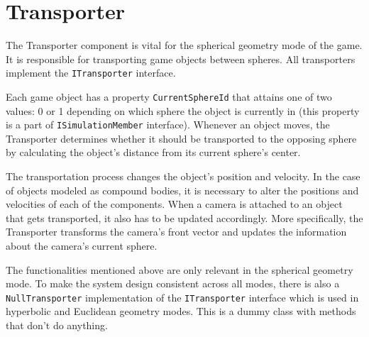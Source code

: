\section{Transporter}
The Transporter component is vital for the spherical geometry mode of the game.
It is responsible for transporting game objects between spheres.
All transporters implement the \texttt{ITransporter} interface.

Each game object has a property \texttt{CurrentSphereId} that attains one of two values: 0 or 1 depending on which sphere the object is currently in (this property is a part of \texttt{ISimulationMember} interface).
Whenever an object moves, the Transporter determines whether it should be transported to the opposing sphere by calculating the object's distance from its current sphere's center.

The transportation process changes the object's position and velocity.
In the case of objects modeled as compound bodies, it is necessary to alter the positions and velocities of each of the components.
When a camera is attached to an object that gets transported, it also has to be updated accordingly.
More specifically, the Transporter transforms the camera's front vector and updates the information about the camera's current sphere.

The functionalities mentioned above are only relevant in the spherical geometry mode.
To make the system design consistent across all modes, there is also a \texttt{NullTransporter} implementation of the \texttt{ITransporter} interface which is used in hyperbolic and Euclidean geometry modes.
This is a dummy class with methods that don't do anything.